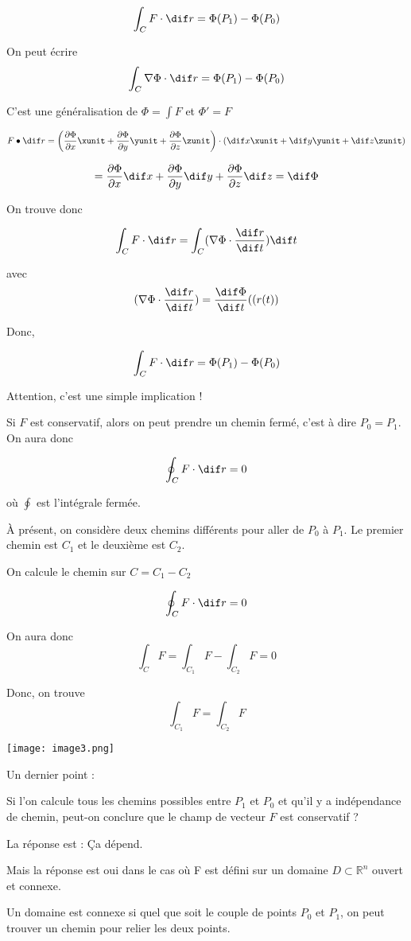 \[\int_C F\cdot \dif r = \Phi ( P_1 ) - \Phi ( P_0) \]

On peut écrire
\[\int_C \nabla \Phi \cdot \dif r =  \Phi ( P_1 ) - \Phi ( P_0) \]

C'est une généralisation de $\Phi = \int F $ et $\Phi ' = F $

\[F\bullet \dif r = \left( \frac{\partial \Phi }{\partial x} \xunit + \frac{\partial \Phi }{\partial y} \yunit +\frac{\partial \Phi }{\partial z} \zunit \right)\cdot (\dif x \xunit + \dif y \yunit + \dif z \zunit)\]

\[=\frac{\partial \Phi}{\partial x}\dif x + \frac{\partial \Phi}{\partial y}\dif y +\frac{\partial \Phi}{\partial z}\dif z = \dif \Phi\]

On trouve donc

\[\int_C F\cdot \dif r = \int_C ( \nabla \Phi \cdot \frac{\dif r}{\dif t} ) \dif t \]

avec \[( \nabla \Phi \cdot \frac{\dif r}{\dif t} )= \frac{\dif \Phi}{\dif t}((r(t))\]

Donc,

\[\int_C F\cdot \dif r = \Phi ( P_1 ) - \Phi ( P_0) \]

Attention, c'est une simple implication !

Si $F$ est conservatif, alors
on peut prendre un chemin fermé, c'est à dire $P_0 = P_1$. On aura donc

\[\oint _C F\cdot \dif r = 0\]

où $ \oint $ est l'intégrale fermée.

À présent, on considère deux chemins différents pour aller de $P_0$ à $P_1$. Le premier chemin est $C_1$ et le deuxième est $C_2$.

On calcule le chemin sur $C = C_1-C_2$

\[\oint _C F\cdot \dif r = 0\]

On aura donc \[\int_C F = \int_{C_1} F - \int_{C_2} F = 0\]

Donc, on trouve
\[\int_{C_1} F = \int_{C_2} F \]

\texttt{[image: image3.png]}

Un dernier point :

Si l'on calcule tous les chemins possibles entre $P_1$ et $P_0$ et qu'il y a indépendance de chemin, peut-on conclure que le champ de vecteur $F$ est conservatif ?

La réponse est : \og \c Ca dépend\fg{}.

Mais la réponse est oui dans le cas où F est défini sur un domaine $D\subset \mathbb{R}^n$ ouvert et connexe.
\begin{mydef}

Un domaine est connexe si quel que soit le couple de points $P_0$ et $P_1$, on peut trouver un chemin pour relier les deux points.
\end{mydef}


